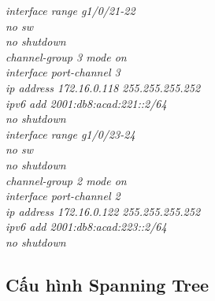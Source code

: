 \documentclass[12pt,a4paper]{report}
\begin{document}
\hspace*{2cm}\textit{interface range g1/0/21-22\\
\hspace*{2cm}no sw\\
\hspace*{2cm}no shutdown\\
\hspace*{2cm}channel-group 3 mode on \\
\hspace*{2cm}interface port-channel 3\\
\hspace*{2cm}ip address 172.16.0.118 255.255.255.252\\
\hspace*{2cm}ipv6 add 2001:db8:acad:221::2/64\\
\hspace*{2cm}no shutdown\\
\hspace*{2cm}interface range g1/0/23-24\\
\hspace*{2cm}no sw\\
\hspace*{2cm}no shutdown\\
\hspace*{2cm}channel-group 2 mode on \\
\hspace*{2cm}interface port-channel 2\\
\hspace*{2cm}ip address 172.16.0.122 255.255.255.252\\
\hspace*{2cm}ipv6 add 2001:db8:acad:223::2/64\\
\hspace*{2cm}no shutdown\\}
\subsection{Cấu hình Spanning Tree }
\end{document}

